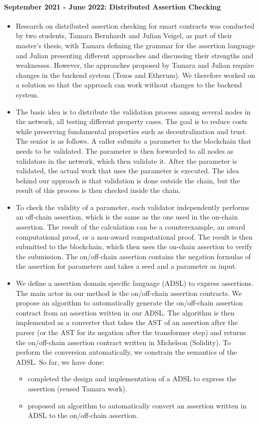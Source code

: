 \documentclass[a4paper,11pt]{article}
\begin{document}
\paragraph{September 2021 - June 2022: Distributed  Assertion Checking}
\begin{itemize}
\item Research on distributed assertion checking for smart contracts was conducted by two students, Tamara Bernhardt and Julian Veigel, as part of their master's thesis, with Tamara defining the grammar for the assertion language and Julian presenting different approaches and discussing their strengths and weaknesses. However, the approaches proposed by Tamara and Julian require changes  in the backend system (Tezos and Etherum). We therefore worked on a solution so that the approach can work without changes to the backend system.
\item 
The basic idea is to distribute the validation process among several nodes in the network, all testing different property cases. The goal is to reduce costs while preserving fundamental properties such as decentralization and trust. The senior is as follows. A caller submits a parameter to the blockchain that needs to be validated. The parameter is then forwarded to all nodes as validators in the network, which then validate it. After the parameter is validated, the actual work that uses the parameter is executed. The idea behind our approach is that validation is done outside the chain, but the result of this process is then checked inside the chain. 
\item To check the validity of a parameter, each validator independently performs an off-chain assertion, which is the same as the one used in the on-chain assertion. The result of the calculation can be
a counterexample, an award computational proof, or a non-award computational
proof. The result is then submitted to the blockchain, which then uses the on-chain assertion to verify the submission. The on/off-chain assertion contains the negation formulas of the assertion for parameters and takes a seed and a parameter as input.
\item We define a assertion domain specific language (ADSL) to express assertions. The main actor in our method is the on/off-chain assertion contracts. We propose an algorithm to automatically generate the on/off-chain assertion contract from an assertion written in our ADSL. The algorithm is then implemented as a converter that takes the AST of an assertion after the parser (or the AST for its negation after the transformer step) and returns the on/off-chain assertion contract written in Michelson (Solidity). To perform the conversion automatically, we constrain the semantics of the ADSL. So far, we have done:
\begin{itemize}
\item completed the design and implementation of a ADSL to express the assertion (reused Tamara work).
\item proposed an algorithm to automatically convert an assertion  written in ADSL to the on/off-chain assertion.
\end{itemize}
\end{itemize}  
\end{document}
